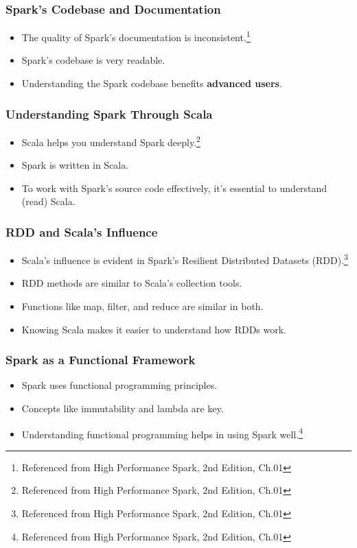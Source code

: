 %
\begin{frame}
    \frametitle{Spark's Codebase and Documentation}
    \begin{itemize}
        \item The quality of Spark's documentation is inconsistent.\footnote{Referenced from High Performance Spark, 2nd Edition, Ch.01}
        \item Spark's codebase is very readable.
        \item Understanding the Spark codebase benefits \textbf{advanced users}.
    \end{itemize}

\end{frame}

\begin{frame}
    \frametitle{Understanding Spark Through Scala}
    \begin{itemize}
        \item Scala helps you understand Spark deeply.\footnote{Referenced from High Performance Spark, 2nd Edition, Ch.01}
        \item Spark is written in Scala.
        \item To work with Spark's source code effectively, it's essential to understand (read) Scala.
    \end{itemize}

\end{frame}

\begin{frame}
    \frametitle{RDD and Scala's Influence}
    \begin{itemize}
        \item Scala's influence is evident in Spark's Resilient Distributed Datasets (RDD).\footnote{Referenced from High Performance Spark, 2nd Edition, Ch.01}
        \item RDD methods are similar to Scala's collection tools.
        \item Functions like map, filter, and reduce are similar in both.
        \item Knowing Scala makes it easier to understand how RDDs work.
    \end{itemize}

\end{frame}

\begin{frame}
    \frametitle{Spark as a Functional Framework}
    \begin{itemize}
        \item Spark uses functional programming principles.
        \item Concepts like immutability and lambda are key.
        \item Understanding functional programming helps in using Spark well.\footnote{Referenced from High Performance Spark, 2nd Edition, Ch.01}
    \end{itemize}

\end{frame}

